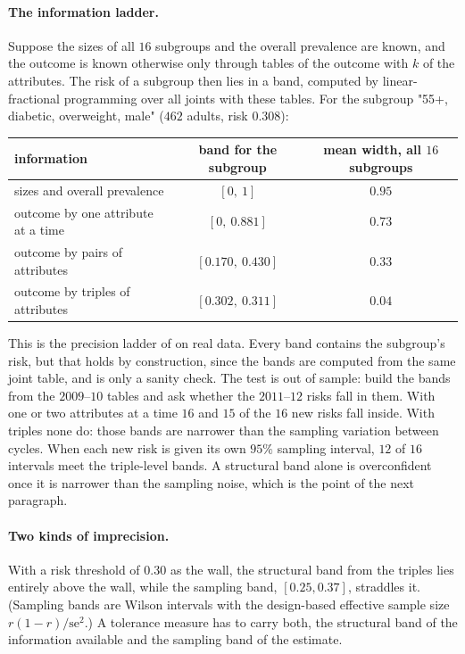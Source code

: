 \documentclass[11pt]{article}
\theoremstyle{definition}
\theoremstyle{remark}
\begin{document}
\paragraph{The information ladder.} Suppose the sizes of all $16$ subgroups and the overall prevalence are known, and the outcome is
known otherwise only through tables of the outcome with $k$ of the attributes. The risk of a subgroup then lies in a band, computed by linear-fractional
programming over all joints with these tables. For the subgroup "55+, diabetic, overweight, male" ($462$ adults, risk $0.308$):

\begin{center}
\begin{tabular}{lcc}
\toprule
information & band for the subgroup & mean width, all $16$ subgroups\\
\midrule
sizes and overall prevalence & $[0,\ 1]$ & $0.95$\\
outcome by one attribute at a time & $[0,\ 0.881]$ & $0.73$\\
outcome by pairs of attributes & $[0.170,\ 0.430]$ & $0.33$\\
outcome by triples of attributes & $[0.302,\ 0.311]$ & $0.04$\\
\bottomrule
\end{tabular}
\end{center}

This is the precision ladder of \cite[Thm.~3.5]{Attribution} on real data. Every band contains the subgroup's risk, but that holds by
construction, since the bands are computed from the same joint table, and is only a sanity check. The test is out of sample:
build the bands from the $2009$--$10$ tables and ask whether the $2011$--$12$ risks fall in them. With one or two attributes at a time
$16$ and $15$ of the $16$ new risks fall inside. With triples none do: those bands are narrower than the sampling variation between
cycles. When each new risk is given its own $95\%$ sampling interval, $12$ of $16$ intervals meet the triple-level bands. A structural
band alone is overconfident once it is narrower than the sampling noise, which is the point of the next paragraph.

\paragraph{Two kinds of imprecision.} With a risk threshold of $0.30$ as the wall, the structural band from the triples lies entirely
above the wall, while the sampling band, $[0.25,0.37]$, straddles it. (Sampling bands are Wilson intervals with the
design-based effective sample size $r(1-r)/\mathrm{se}^2$.) A tolerance measure has to carry both, the structural band
of the information available and the sampling band of the estimate.
\end{document}
